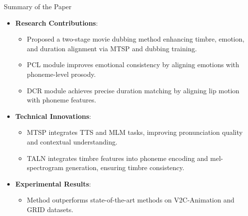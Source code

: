\begin{frame}{Summary of the Paper}
\begin{itemize}
    \item \textbf{Research Contributions}:
    \begin{itemize}
        \item Proposed a two-stage movie dubbing method enhancing timbre, emotion, and duration alignment via MTSP and dubbing training.
        \item PCL module improves emotional consistency by aligning emotions with phoneme-level prosody.
        \item DCR module achieves precise duration matching by aligning lip motion with phoneme features.
    \end{itemize}
    \item \textbf{Technical Innovations}:
    \begin{itemize}
        \item MTSP integrates TTS and MLM tasks, improving pronunciation quality and contextual understanding.
        \item TALN integrates timbre features into phoneme encoding and mel-spectrogram generation, ensuring timbre consistency.
    \end{itemize}
    \item \textbf{Experimental Results}:
    \begin{itemize}
        \item Method outperforms state-of-the-art methods on V2C-Animation and GRID datasets.
    \end{itemize}
\end{itemize}
\end{frame}
